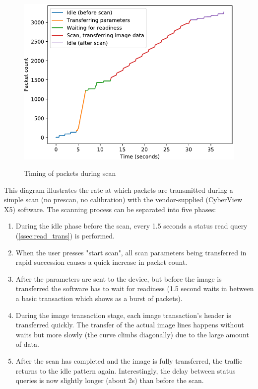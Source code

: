 \documentclass{article}
\begin{document}
\begin{figure}[H]
  \caption{Timing of packets during scan}
  \centering
  \includegraphics[width=\textwidth]{images/time_diagram.pdf}
  \label{time_diagram}
\end{figure}

This diagram illustrates the rate at which packets are transmitted
during a simple scan (no prescan, no calibration) with the vendor-supplied
(CyberView X5) software.
The scanning process can be separated into five phases:

\begin{enumerate}

\item During the idle phase before the scan, every 1.5 seconds a status read query
(\ref{ssec:read_trans}) is performed.

\item When the user presses "start scan", all scan parameters being transferred
in rapid succession causes a quick increase in packet count.

\item After the parameters are sent to the device, but before the image is transferred
the software has to wait for readiness (1.5 second waits in between a basic transaction
which shows as a burst of packets).

\item During the image transaction stage, each image transaction's header is
transferred quickly. The transfer of the actual image lines happens without waits
but more slowly (the curve climbs diagonally) due to the large amount of data.

\item After the scan has completed and the image is fully transferred,
the traffic returns to the idle pattern again. Interestingly, the delay
between status queries is now slightly longer (about 2s) than before the scan.

\end{enumerate}
\end{document}
